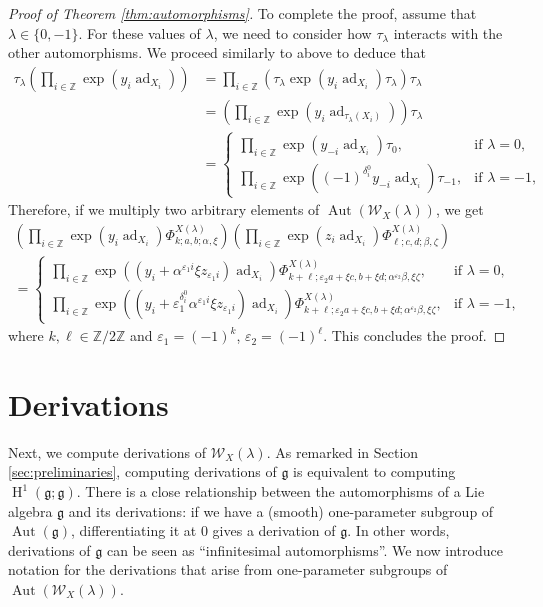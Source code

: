 \documentclass[11pt, svgnames]{amsart}
\DeclareMathOperator{\ad}{ad}
\newcommand{\g}{\ensuremath{\mathfrak{g}}}
\newcommand{\ZZ}{\mathbb{Z}}
\newcommand{\W}{\mathcal{W}}
\DeclareMathOperator{\Aut}{Aut}
\DeclareMathOperator{\HH}{H}
\theoremstyle{definition}
\begin{document}
\begin{proof}[Proof of Theorem \ref{thm:automorphisms}]
    To complete the proof, assume that $\lambda \in \{0,-1\}$. For these values of $\lambda$, we need to consider how $\tau_\lambda$ interacts with the other automorphisms. We proceed similarly to above to deduce that
    \begin{align*}
        \tau_\lambda \left(\prod_{i \in \ZZ} \exp(y_i \ad_{X_i})\right) &= \prod_{i \in \ZZ} \left(\tau_\lambda \exp(y_i \ad_{X_i}) \tau_\lambda \right) \tau_\lambda \\
        &= \left(\prod_{i \in \ZZ} \exp(y_i \ad_{\tau_\lambda(X_i)})\right) \tau_\lambda \\
        &= \begin{cases}
            \prod_{i \in \ZZ} \exp(y_{-i} \ad_{X_i}) \tau_0, &\text{if } \lambda = 0, \\
            \prod_{i \in \ZZ} \exp((-1)^{\delta_i^0}y_{-i} \ad_{X_i}) \tau_{-1}, &\text{if } \lambda = -1,
        \end{cases}
    \end{align*}
    Therefore, if we multiply two arbitrary elements of $\Aut(\W_X(\lambda))$, we get
    \begin{multline*}
        \left(\prod_{i \in \ZZ} \exp(y_i \ad_{X_i}) \Phi_{k;a,b;\alpha,\xi}^{X(\lambda)}\right)\left(\prod_{i \in \ZZ} \exp(z_i \ad_{X_i}) \Phi_{\ell;c,d;\beta,\zeta}^{X(\lambda)}\right) \\
        = \begin{cases}
            \prod_{i \in \ZZ} \exp((y_i + \alpha^{\varepsilon_1 i} \xi z_{\varepsilon_1 i}) \ad_{X_i}) \Phi_{k + \ell;\varepsilon_2 a + \xi c, b + \xi d; \alpha^{\varepsilon_2} \beta, \xi \zeta}^{X(\lambda)}, &\text{if } \lambda = 0, \\
            \prod_{i \in \ZZ} \exp((y_i + \varepsilon_1^{\delta_i^0} \alpha^{\varepsilon_1 i} \xi z_{\varepsilon_1 i}) \ad_{X_i}) \Phi_{k + \ell;\varepsilon_2 a + \xi c, b + \xi d; \alpha^{\varepsilon_2} \beta, \xi \zeta}^{X(\lambda)}, &\text{if } \lambda = -1,
        \end{cases}
    \end{multline*}
    where $k,\ell \in \ZZ/2\ZZ$ and $\varepsilon_1 = (-1)^k$, $\varepsilon_2 = (-1)^\ell$. This concludes the proof.
\end{proof}

\section{Derivations}\label{sec:derivations}

Next, we compute derivations of $\W_X(\lambda)$. As remarked in Section \ref{sec:preliminaries}, computing derivations of $\g$ is equivalent to computing $\HH^1(\g;\g)$. There is a close relationship between the automorphisms of a Lie algebra $\g$ and its derivations: if we have a (smooth) one-parameter subgroup of $\Aut(\g)$, differentiating it at $0$ gives a derivation of $\g$. In other words, derivations of $\g$ can be seen as ``infinitesimal automorphisms''. We now introduce notation for the derivations that arise from one-parameter subgroups of $\Aut(\W_X(\lambda))$.
\end{document}
